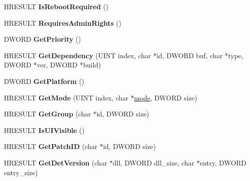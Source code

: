\begin{DoxyCompactItemize}
\mbox{\label{interface_i_cif_component_a0ced28dfccd4d7247c8f389d5d8cb7f8}} 
H\+R\+E\+S\+U\+LT {\bfseries Is\+Reboot\+Required} ()
\item 
\mbox{\label{interface_i_cif_component_ad3ea1e9156c8cc38c505b300e3438320}} 
H\+R\+E\+S\+U\+LT {\bfseries Requires\+Admin\+Rights} ()
\item 
\mbox{\label{interface_i_cif_component_aa75c22c74c4bd8a04eb13a51411c6456}} 
D\+W\+O\+RD {\bfseries Get\+Priority} ()
\item 
\mbox{\label{interface_i_cif_component_aa727304840f1f556d4f5f5720405d379}} 
H\+R\+E\+S\+U\+LT {\bfseries Get\+Dependency} (U\+I\+NT index, char $\ast$id, D\+W\+O\+RD buf, char $\ast$type, D\+W\+O\+RD $\ast$ver, D\+W\+O\+RD $\ast$build)
\item 
\mbox{\label{interface_i_cif_component_ab74882f66c7cf278c67d31a3433c271d}} 
D\+W\+O\+RD {\bfseries Get\+Platform} ()
\item 
\mbox{\label{interface_i_cif_component_aad0df56c406952444aa32d14eb5164c4}} 
H\+R\+E\+S\+U\+LT {\bfseries Get\+Mode} (U\+I\+NT index, char $\ast$\hyperlink{interfacevoid}{mode}, D\+W\+O\+RD size)
\item 
\mbox{\label{interface_i_cif_component_a74e07ef5b0b69de2b2c00c565f038ba6}} 
H\+R\+E\+S\+U\+LT {\bfseries Get\+Group} (char $\ast$id, D\+W\+O\+RD size)
\item 
\mbox{\label{interface_i_cif_component_a04034e3efb6af28d106b8464d6997eb6}} 
H\+R\+E\+S\+U\+LT {\bfseries Is\+U\+I\+Visible} ()
\item 
\mbox{\label{interface_i_cif_component_a9bd26b76c7d55b8a07a66de92c0d18b5}} 
H\+R\+E\+S\+U\+LT {\bfseries Get\+Patch\+ID} (char $\ast$id, D\+W\+O\+RD size)
\item 
\mbox{\label{interface_i_cif_component_a0eaec1980cc26c310b19f6f28f545a8c}} 
H\+R\+E\+S\+U\+LT {\bfseries Get\+Det\+Version} (char $\ast$dll, D\+W\+O\+RD dll\+\_\+size, char $\ast$entry, D\+W\+O\+RD entry\+\_\+size)

\end{DoxyCompactItemize}
